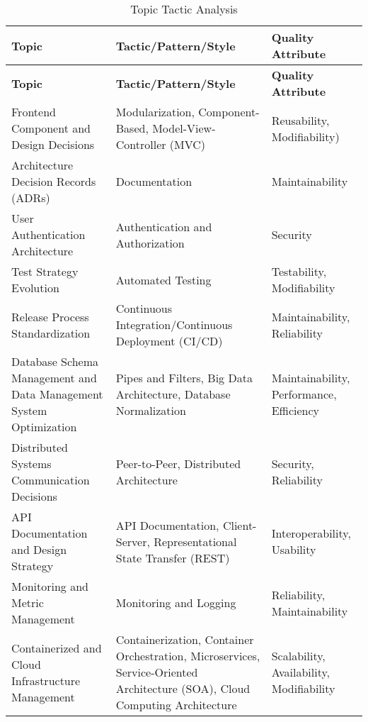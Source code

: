 {\small
    \begin{longtable}{|p{5cm}|p{6cm}|p{3cm}|}
        \caption{Topic Tactic Analysis}
        \label{table:topic_tactic}
        \hline
        \textbf{Topic} & \textbf{Tactic/Pattern/Style} & \textbf{Quality Attribute} \\
        \hline
        \endfirsthead
        
        \hline
        \textbf{Topic} & \textbf{Tactic/Pattern/Style} & \textbf{Quality Attribute} \\
        \hline
        \endhead
        
        \hline
        \endfoot
        
        \hline
        \endlastfoot
        
        Frontend Component and Design Decisions & Modularization, Component-Based, Model-View-Controller (MVC) & Reusability, Modifiability) \\
        \hline
        Architecture Decision Records (ADRs) & Documentation & Maintainability \\
        \hline
        User Authentication Architecture & Authentication and Authorization & Security \\
        \hline
        Test Strategy Evolution & Automated Testing & Testability, Modifiability \\
        \hline
        Release Process Standardization & Continuous Integration/Continuous Deployment (CI/CD) & Maintainability, Reliability \\
        \hline
        Database Schema Management and Data Management System Optimization & Pipes and Filters, Big Data Architecture, Database Normalization & Maintainability, Performance, Efficiency \\
        \hline
        Distributed Systems Communication Decisions & Peer-to-Peer, Distributed Architecture & Security, Reliability \\
        \hline
        API Documentation and Design Strategy & API Documentation, Client-Server, Representational State Transfer (REST) & Interoperability, Usability \\
        \hline
        Monitoring and Metric Management & Monitoring and Logging & Reliability, Maintainability \\
        \hline
        Containerized and Cloud Infrastructure Management & Containerization, Container Orchestration, Microservices, Service-Oriented Architecture (SOA), Cloud Computing Architecture & Scalability, Availability, Modifiability \\

\end{longtable}}
